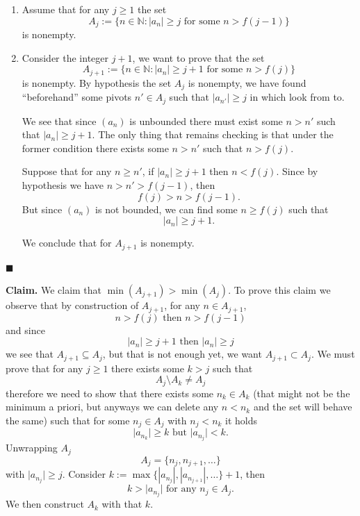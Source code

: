 \documentclass{article}
\theoremstyle{remark}
\newenvironment{claim}{\textbf{Claim.}}{}
\begin{document}
\begin{enumerate}
\begin{enumerate}
        \item[\textbf{Hypothesis.}] Assume that for any $j \geq 1$ the set 
        \[
            A_j := \{n \in \mathbb{N}: |a_n| \geq j \text{ for some } n > f(j-1)\}
        \]
        is nonempty.

        \item[\textbf{Thesis.}] Consider the integer $j+1$, we want to prove that the set 
        \[
            A_{j+1} := \{n \in \mathbb{N}: |a_n| \geq j+1 \text{ for some } n > f(j)\}
        \] 
        is nonempty.
        By hypothesis the set $A_j$ is nonempty, we have found ``beforehand'' some pivots $n' \in A_j$ such that $\vert a_{n'}\vert \geq j$ in which look from to.
        
        We see that since $(a_n)$ is unbounded there must exist some $n > n'$ such that 
        $\vert a_{n} \vert \geq j+1$.
        The only thing that remains checking is that under the former condition 
        there exists some $n > n'$ such that $n > f(j)$.
        
        Suppose that for any $n \geq n'$, if $\vert a_n \vert \geq j+1$ 
        then $n < f(j)$.
        Since by hypothesis we have $n > n' > f(j-1)$, then 
        \[
        f(j) > n > f(j-1).
        \]
        But since $(a_n)$ is not bounded, we can find some $n \geq f(j)$ such that
        \[
        \vert a_n \vert \geq j+1.
        \]
        
        We conclude that for $A_{j+1}$ is nonempty.
    \end{enumerate}
    \begin{flushright}
        $\blacksquare$
    \end{flushright}
        
    \begin{claim} We claim that $\min(A_{j+1}) > \min(A_{j})$. To prove this claim we observe
    that by construction of $A_{j+1}$, for any $n \in A_{j+1}$, 
    \[
    n > f(j) \text{ then } n > f(j-1)
    \]
    and since 
    \[
    \vert a_n \vert \geq j+1 \text{ then } \vert a_n \vert \geq j
    \]
    we see that $A_{j+1} \subseteq A_{j}$, but that is not enough yet, we want $A_{j+1} \subset A_j$.
    We must prove that for any $j \geq 1$ there exists some $k > j$ such that
    \[
    A_j \setminus A_k \neq A_j
    \]
    therefore we need to show that there exists some $n_k \in A_k$ (that might not be the minimum a priori, but anyways we can delete any $n < n_k$ and the 
    set will behave the same) such that for some $n_j \in A_j$ with $n_j < n_k$ it holds
    \[
    \vert a_{n_k} \vert \geq k \text{ but } \vert a_{n_j} \vert < k.
    \]
    Unwrapping $A_j$
    \[
    A_j = \{n_j, n_{j+1}, \dots\}
    \]
    with $\vert a_{n_j}\vert \geq j$. Consider $k := \max\{|a_{n_j}|, |a_{n_{j+1}}|, \dots \}+1$, 
    then 
    \[
    k > \vert a_{n_j}\vert \text{ for any } n_j \in A_j.
    \]
    We then construct $A_k$ with that $k$.


\end{claim}
\end{enumerate}
\end{document}
